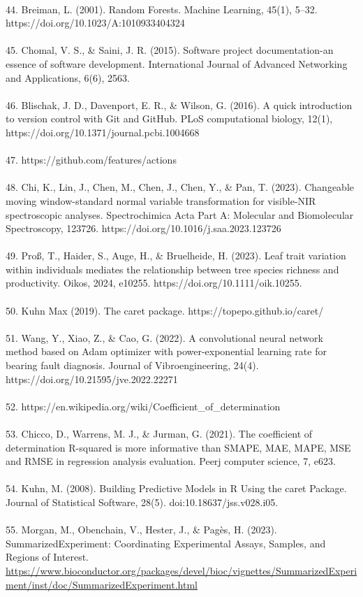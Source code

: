 \documentclass[12pt,a4paper]{report}
\begin{document}
\\
44. Breiman, L. (2001). Random Forests. Machine Learning, 45(1), 5–32. https://doi.org/10.1023/A:1010933404324 \\
\\
45. Chomal, V. S., \& Saini, J. R. (2015). Software project documentation-an essence of software development. International Journal of Advanced Networking and Applications, 6(6), 2563.\\
\\
46. Blischak, J. D., Davenport, E. R., \& Wilson, G. (2016). A quick introduction to version control with Git and GitHub. PLoS computational biology, 12(1), https://doi.org/10.1371/journal.pcbi.1004668\\
\\
47. https://github.com/features/actions \\
\\
48. Chi, K., Lin, J., Chen, M., Chen, J., Chen, Y., \& Pan, T. (2023). Changeable moving window-standard normal variable transformation for visible-NIR spectroscopic analyses. Spectrochimica Acta Part A: Molecular and Biomolecular Spectroscopy, 123726. https://doi.org/10.1016/j.saa.2023.123726 \\
\\
49. Proß, T., Haider, S., Auge, H., \& Bruelheide, H. (2023). Leaf trait variation within individuals mediates the relationship between tree species richness and productivity. Oikos, 2024, e10255. https://doi.org/10.1111/oik.10255. \\
\\
50. Kuhn Max (2019). The caret package. https://topepo.github.io/caret/  \\
\\
51. Wang, Y., Xiao, Z., \& Cao, G. (2022). A convolutional neural network method based on Adam optimizer with power-exponential learning rate for bearing fault diagnosis. Journal of Vibroengineering, 24(4). https://doi.org/10.21595/jve.2022.22271 \\
\\
52. https://en.wikipedia.org/wiki/Coefficient\_of\_determination \\
\\
53. Chicco, D., Warrens, M. J., \& Jurman, G. (2021). The coefficient of determination R-squared is more informative than SMAPE, MAE, MAPE, MSE and RMSE in regression analysis evaluation. Peerj computer science, 7, e623. \\
\\
54. Kuhn, M. (2008). Building Predictive Models in R Using the caret Package. Journal of Statistical Software, 28(5). doi:10.18637/jss.v028.i05. \\
\\
55. Morgan, M., Obenchain, V., Hester, J., \& Pagès, H. (2023). SummarizedExperiment: Coordinating Experimental Assays, Samples, and Regions of Interest. \url{https://www.bioconductor.org/packages/devel/bioc/vignettes/SummarizedExperiment/inst/doc/SummarizedExperiment.html}
\end{document}

